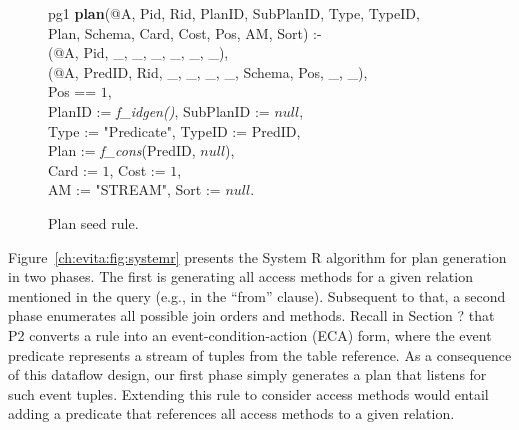 \begin{figure}
\ssp
\centering
\begin{boxedminipage}{\linewidth}
pg1 {\bf plan}(@A, Pid, Rid, PlanID, SubPlanID, Type, TypeID, \\
\datalogspace \xspace \xspace Plan, Schema, Card, Cost, Pos, AM, Sort) :- \\
(@A, Pid, \_, \_, \_, \_, \_, \_),\\
(@A, PredID, Rid, \_, \_, \_, \_, Schema, Pos, \_, \_),\\
\datalogspace Pos == $1$,\\
\datalogspace PlanID := {\em f\_idgen()}, SubPlanID := $null$,\\
\datalogspace Type := "Predicate", TypeID := PredID,\\
\datalogspace Plan := {\em f\_cons}(PredID, $null$),\\
\datalogspace Card := $1$, Cost := $1$,\\
\datalogspace AM := "STREAM", Sort := $null$.
\end{boxedminipage}
\caption{\label{ch:evita:fig:planseed}Plan seed rule.}
\end{figure}

Figure~\ref{ch:evita:fig:systemr} presents the System R algorithm for plan
generation in two phases.  The first is generating all access methods for a
given relation mentioned in the query (e.g., in the ``from'' clause).
Subsequent to that, a second phase enumerates all possible join orders and
methods.  Recall in Section ? that P2 converts a rule into an
event-condition-action (ECA) form, where the event predicate represents a
stream of tuples from the table reference.  As a consequence of this dataflow
design, our first phase simply generates a plan that listens for such event
tuples.  Extending this rule to consider access methods would entail adding a
predicate that references all access methods to a given relation.

